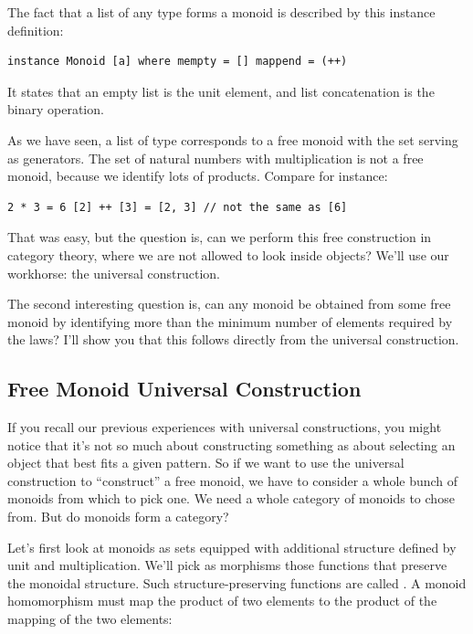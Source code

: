 The fact that a list of any type forms a monoid is described by this
instance definition:

\begin{verbatim}
instance Monoid [a] where mempty = [] mappend = (++)
\end{verbatim}

It states that an empty list \code{{[}{]}} is the unit element, and
list concatenation \code{(++)} is the binary operation.

As we have seen, a list of type  corresponds to a free monoid
with the set  serving as generators. The set of natural
numbers with multiplication is not a free monoid, because we identify
lots of products. Compare for instance:

\begin{verbatim}
2 * 3 = 6 [2] ++ [3] = [2, 3] // not the same as [6]
\end{verbatim}

That was easy, but the question is, can we perform this free
construction in category theory, where we are not allowed to look inside
objects? We'll use our workhorse: the universal construction.

The second interesting question is, can any monoid be obtained from some
free monoid by identifying more than the minimum number of elements
required by the laws? I'll show you that this follows directly from the
universal construction.

\subsection{Free Monoid Universal
Construction}\label{free-monoid-universal-construction}

If you recall our previous experiences with universal constructions, you
might notice that it's not so much about constructing something as about
selecting an object that best fits a given pattern. So if we want to use
the universal construction to ``construct'' a free monoid, we have to
consider a whole bunch of monoids from which to pick one. We need a
whole category of monoids to chose from. But do monoids form a category?

Let's first look at monoids as sets equipped with additional structure
defined by unit and multiplication. We'll pick as morphisms those
functions that preserve the monoidal structure. Such
structure-preserving functions are called . A monoid
homomorphism must map the product of two elements to the product of the
mapping of the two elements:

